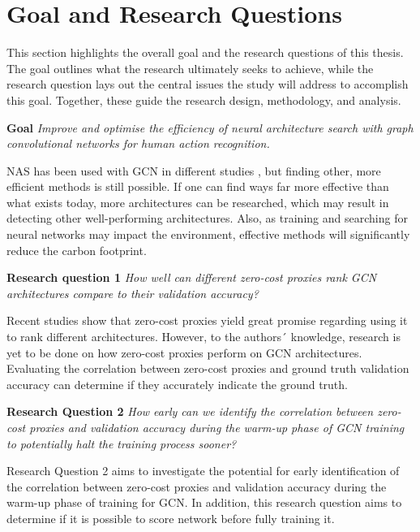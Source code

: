 \section{Goal and Research Questions}\label{section:goalsandrq}

This section highlights the overall goal and the research questions of this thesis. The goal outlines what the research ultimately seeks to achieve, while the research question lays out the central issues the study will address to accomplish this goal. Together, these guide the research design, methodology, and analysis. 

\textbf{Goal} \textit{Improve and optimise the efficiency of neural architecture search with graph convolutional networks for human action recognition.} 

\gls{NAS} has been used with \gls{GCN} in different studies \autocite{zhou2019auto, groos2022toward, peng2020learning}, but finding other, more efficient methods is still possible. If one can find ways far more effective than what exists today, more architectures can be researched, which may result in detecting other well-performing architectures. Also, as training and searching for neural networks may impact the environment, effective methods will significantly reduce the carbon footprint. 

\textbf{Research question 1} \textit{How well can different zero-cost proxies rank \gls{GCN} architectures compare to their validation accuracy?}

Recent studies \autocite{abdelfattah2021zero, colin2022adeeperlook} show that zero-cost proxies yield great promise regarding using it to rank different architectures. However, to the authors´ knowledge, research is yet to be done on how zero-cost proxies perform on \gls{GCN} architectures. Evaluating the correlation between zero-cost proxies and ground truth validation accuracy can determine if they accurately indicate the ground truth.


\textbf{Research Question 2} \textit{How early can we identify the correlation between zero-cost proxies and validation accuracy during the warm-up phase of \gls{GCN} training to potentially halt the training process sooner?}


Research Question 2 aims to investigate the potential for early identification of the correlation between zero-cost proxies and validation accuracy during the warm-up phase of training for \gls{GCN}. In addition, this research question aims to determine if it is possible to score network before fully training it. 


